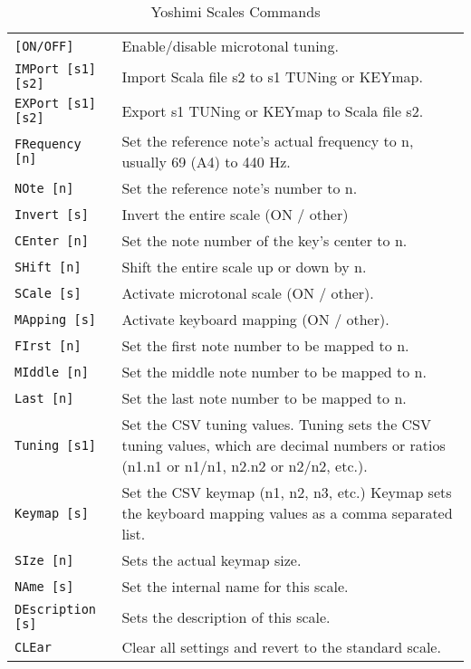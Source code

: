 \begin{center}
\begin{longtable}{p{4cm} p{10cm}}
\caption[Yoshimi Scales Commands]{Yoshimi Scales Commands} \\

\texttt{[ON/OFF]} & Enable/disable microtonal tuning. \\
\texttt{IMPort [s1] [s2]} &
   Import Scala file s2 to s1 TUNing or KEYmap.  \\
\texttt{EXPort [s1] [s2]} &
   Export s1 TUNing or KEYmap to Scala file s2. \\

\texttt{FRequency [n]} &
   Set the reference note's actual frequency to n, usually 69 (A4) to 440 Hz.
   \\
\texttt{NOte [n]} &
   Set the reference note's number to n. \\
\texttt{Invert [s]} &
   Invert the entire scale (ON / other) \\
\texttt{CEnter [n]} &
   Set the note number of the key's center to n. \\
\texttt{SHift [n]} &
   Shift the entire scale up or down by n. \\
\texttt{SCale [s]} &
   Activate microtonal scale (ON / other). \\
\texttt{MApping [s]} &
   Activate keyboard mapping (ON / other). \\
\texttt{FIrst [n]} &
   Set the first note number to be mapped to n. \\
\texttt{MIddle [n]} &
   Set the middle note number to be mapped to n. \\
\texttt{Last [n]} &
   Set the last note number to be mapped to n. \\
\texttt{Tuning [s1]} &
   Set the CSV tuning values.
   Tuning sets the CSV tuning values, which are decimal numbers or ratios
   (n1.n1 or n1/n1, n2.n2 or n2/n2, etc.).\\
\texttt{Keymap [s]} &
   Set the CSV keymap (n1, n2, n3, etc.)
   Keymap sets the keyboard mapping values as a comma separated list. \\
\texttt{SIze [n]} &
   Sets the actual keymap size. \\
\texttt{NAme [s]} &
   Set the internal name for this scale. \\
\texttt{DEscription [s]} &
   Sets the description of this scale. \\
\texttt{CLEar} &
   Clear all settings and revert to the standard scale. \\
\end{longtable}
\end{center}

